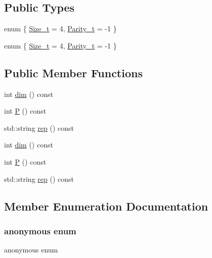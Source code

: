 \subsection*{Public Types}
\begin{DoxyCompactItemize}
\item 
enum \{ \mbox{\hyperlink{structHadron_1_1J3o2uRep_a40ef2ad2b3687daa5aa8710a9b0893aca2f8e61920aeb7fc12e9724e3916cd088}{Size\+\_\+t}} = 4, 
\mbox{\hyperlink{structHadron_1_1J3o2uRep_a40ef2ad2b3687daa5aa8710a9b0893acaadedf5e86c0b6472a7563e993e25f84d}{Parity\+\_\+t}} = -\/1
 \}
\item 
enum \{ \mbox{\hyperlink{structHadron_1_1J3o2uRep_a40ef2ad2b3687daa5aa8710a9b0893aca2f8e61920aeb7fc12e9724e3916cd088}{Size\+\_\+t}} = 4, 
\mbox{\hyperlink{structHadron_1_1J3o2uRep_a40ef2ad2b3687daa5aa8710a9b0893acaadedf5e86c0b6472a7563e993e25f84d}{Parity\+\_\+t}} = -\/1
 \}
\end{DoxyCompactItemize}
\subsection*{Public Member Functions}
\begin{DoxyCompactItemize}
\item 
int \mbox{\hyperlink{structHadron_1_1J3o2uRep_a02d95a2eb65dcc65b2e8904496fbe0b4}{dim}} () const
\item 
int \mbox{\hyperlink{structHadron_1_1J3o2uRep_a9e81ffb5181e3276f1e607a3fa90d62a}{P}} () const
\item 
std\+::string \mbox{\hyperlink{structHadron_1_1J3o2uRep_aa8a4755a7dfd43ada92526d1e9a3c370}{rep}} () const
\item 
int \mbox{\hyperlink{structHadron_1_1J3o2uRep_a02d95a2eb65dcc65b2e8904496fbe0b4}{dim}} () const
\item 
int \mbox{\hyperlink{structHadron_1_1J3o2uRep_a9e81ffb5181e3276f1e607a3fa90d62a}{P}} () const
\item 
std\+::string \mbox{\hyperlink{structHadron_1_1J3o2uRep_aa8a4755a7dfd43ada92526d1e9a3c370}{rep}} () const
\end{DoxyCompactItemize}


\subsection{Member Enumeration Documentation}
\mbox{\label{structHadron_1_1J3o2uRep_a03f1164cdb895991ec3c066685facf11}} 
\subsubsection{\texorpdfstring{anonymous enum}{anonymous enum}}
{\footnotesize\ttfamily anonymous enum}

